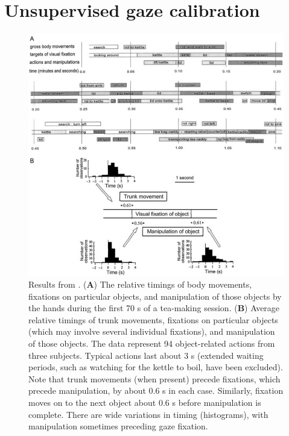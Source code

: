 \documentclass[11pt,a4paper]{article}
\begin{document}
\section{Unsupervised gaze calibration}
\begin{figure}[!ht]
\begin{center}
\includegraphics[scale=0.5]{Pictures/GazeObjectBehavior_Land.png}
\end{center}
\caption{Results from \cite{Land2009}. (\textbf{A}) The relative timings of body movements, fixations on particular objects, and manipulation of those objects by the hands during the first 70 s of a tea-making session.
(\textbf{B}) Average relative timings of trunk movements,
fixations on particular objects (which may involve several individual fixations), and manipulation of those objects. The data represent
94 object-related actions from three subjects. Typical actions last about 3 s (extended waiting periods, such as watching for the kettle to
boil, have been excluded). Note that trunk movements (when present) precede fixations, which precede manipulation, by about 0.6 s in
each case. Similarly, fixation moves on to the next object about 0.6 s before manipulation is complete. There are wide variations in timing
(histograms), with manipulation sometimes preceding gaze fixation.\label{LandResults}}
\end{figure}

\clearpage


\end{document}
